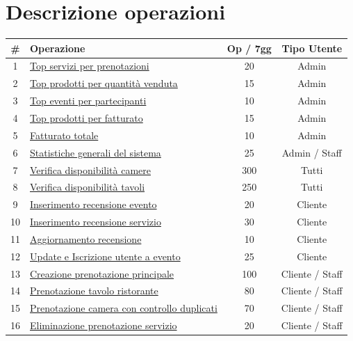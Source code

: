 \documentclass[a4paper,12pt]{report}
\begin{document}
\section{Descrizione operazioni}
\begin{table}[H]
  \centering
  \small
  \renewcommand{\arraystretch}{1.12}
  \begin{tabularx}{\textwidth}{|c|>{\raggedright\arraybackslash}X|c|c|}
    \hline
    \rowcolor{gray!20}
    \textbf{\#} & \textbf{Operazione} & \textbf{Op / 7gg} & \textbf{Tipo Utente} \\
    \hline
    1 & \hyperref[op1]{Top servizi per prenotazioni} & 20 & Admin \\
    \hline
    2 & \hyperref[op2]{Top prodotti per quantità venduta} & 15 & Admin \\
    \hline
    3 & \hyperref[op3]{Top eventi per partecipanti} & 10 & Admin \\
    \hline
    4 & \hyperref[op4]{Top prodotti per fatturato} & 15 & Admin \\
    \hline
    5 & \hyperref[op5]{Fatturato totale} & 10 & Admin \\
    \hline
    6 & \hyperref[op6]{Statistiche generali del sistema} & 25 & Admin / Staff \\
    \hline
    7 & \hyperref[op7]{Verifica disponibilità camere} & 300 & Tutti \\
    \hline
    8 & \hyperref[op8]{Verifica disponibilità tavoli} & 250 & Tutti \\
    \hline
    9 & \hyperref[op9]{Inserimento recensione evento} & 20 & Cliente \\
    \hline
    10 & \hyperref[op10]{Inserimento recensione servizio} & 30 & Cliente \\
    \hline
    11 & \hyperref[op11]{Aggiornamento recensione} & 10 & Cliente \\
    \hline
    12 & \hyperref[op12]{Update e Iscrizione utente a evento} & 25 & Cliente \\
    \hline
    13 & \hyperref[op13]{Creazione prenotazione principale} & 100 & Cliente / Staff \\
    \hline
    14 & \hyperref[op14]{Prenotazione tavolo ristorante} & 80 & Cliente / Staff \\
    \hline
    15 & \hyperref[op15]{Prenotazione camera con controllo duplicati} & 70 & Cliente / Staff \\
    \hline
    16 & \hyperref[op16]{Eliminazione prenotazione servizio} & 20 & Cliente / Staff \\

\end{tabularx}
\end{table}
\end{document}
